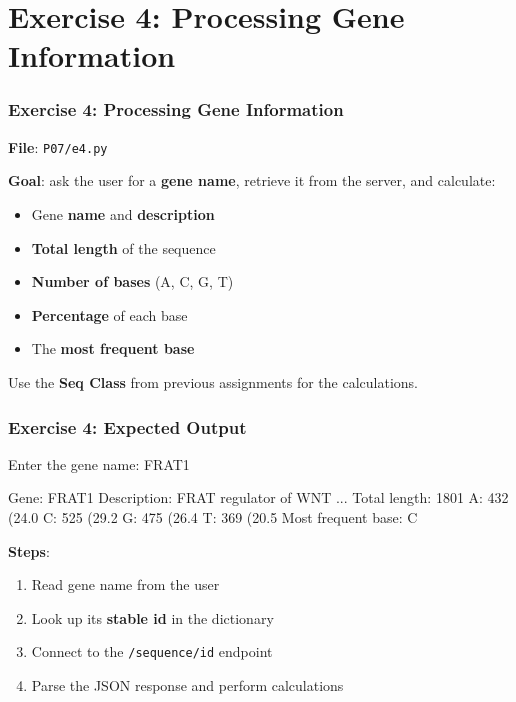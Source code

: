 \documentclass[xcolor=table]{beamer}
\begin{document}
\section{Exercise 4: Processing Gene Information}

\begin{frame}
\frametitle{Exercise 4: Processing Gene Information}

\textbf{File}: \texttt{P07/e4.py}

\vspace{0.3cm}

\textbf{Goal}: ask the user for a \textbf{gene name}, retrieve it from the server, and calculate:

\vspace{0.2cm}

\begin{itemize}
\item Gene \textbf{name} and \textbf{description}
\item \textbf{Total length} of the sequence
\item \textbf{Number of bases} (A, C, G, T)
\item \textbf{Percentage} of each base
\item The \textbf{most frequent base}
\end{itemize}

\vspace{0.3cm}

Use the \textbf{Seq Class} from previous assignments for the calculations.

\end{frame}

\begin{frame}[fragile]
\frametitle{Exercise 4: Expected Output}

\begin{python}[language={}]
Enter the gene name: FRAT1

Gene: FRAT1
Description: FRAT regulator of WNT ...
Total length: 1801
A: 432 (24.0%
C: 525 (29.2%
G: 475 (26.4%
T: 369 (20.5%
Most frequent base: C
\end{python}

\vspace{0.2cm}

\textbf{Steps}:
\begin{enumerate}
\item Read gene name from the user
\item Look up its \textbf{stable id} in the dictionary
\item Connect to the \texttt{/sequence/id} endpoint
\item Parse the JSON response and perform calculations
\end{enumerate}

\end{frame}
\end{document}
